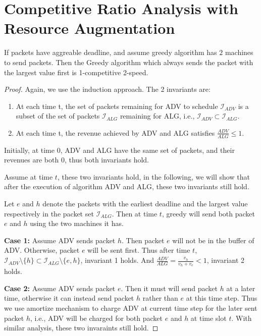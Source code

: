 \documentclass[10 pt,final]{article}
\begin{document}
\section{Competitive Ratio Analysis with Resource Augmentation}
\begin{lemma} If packets have aggreable deadline, and assume greedy algorithm has $2$ machines to send packets. Then the Greedy algorithm which always sends the packet with the largest value first is 1-competitive 2-speed.
\end{lemma}

\begin{proof} Again, we use the induction approach. The 2 invariants are:
\begin{enumerate}
\item At each time t, the set of packets remaining for ADV to schedule $\mathcal{I}_{ADV}$ is a subset of the set of packets $\mathcal{I}_{ALG}$ remaining for ALG, i.e., $\mathcal{I}_{ADV} \subset \mathcal{I}_{ALG}$.
\item At each time t, the revenue achieved by ADV and ALG satisfies $\frac{ADV}{ALG} \leq 1$.
\end{enumerate}

Initially, at time $0$, ADV and ALG have the same set of packets, and their revenues are both $0$, thus both invariants hold. 

Assume at time $t$, these two invariants hold, in the following, we will show that after the execution of algorithm ADV and ALG, these two invariants still hold. 

Let $e$ and $h$ denote the packets with the earliest deadline and the largest value respectively in the packet set $\mathcal{I}_{ALG}$. Then at time $t$, greedy will send both packet $e$ and $h$ using the two machines it has. 

\textbf{Case 1: } Assume ADV sends packet $h$. Then packet $e$ will not be in the buffer of ADV. Otherwise, packet $e$ will be sent first. Thus after time $t$, $\mathcal{I}_{ADV} \setminus \{h\}  \subset \mathcal{I}_{ALG} \setminus \{e,h\}$, invariant 1 holds. And $\frac{ADV}{ALG} = \frac{v_h}{v_h+v_e} < 1$, invariant 2 holds.

\textbf{Case 2:} Assume ADV sends packet $e$. Then it must will send packet $h$ at a later time, otherwise it can instead send packet $h$ rather than $e$ at this time step. Thus we use amortize mechanism to charge ADV at current time step for the later sent packet $h$, i.e., ADV will be charged for both packet $e$ and $h$ at time slot $t$. With similar analysis, these two invaraints still hold.


\end{proof}
\end{document}
